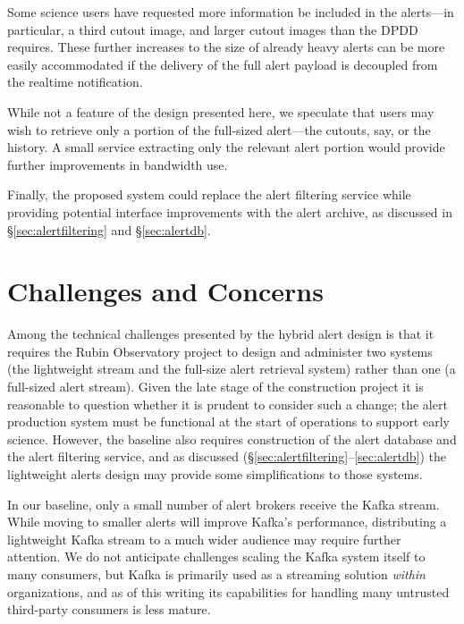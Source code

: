 \documentclass[DM,authoryear,toc]{lsstdoc}
\begin{document}
Some science users have requested more information be included in the alerts---in particular, a third cutout image, and larger cutout images than the DPDD requires.
These further increases to the size of already heavy alerts can be more easily accommodated if the delivery of the full alert payload is decoupled from the realtime notification.

While not a feature of the design presented here, we speculate that users may wish to retrieve only a portion of the full-sized alert---the cutouts, say, or the \DIASource history.
A small service extracting only the relevant alert portion would provide further improvements in bandwidth use.

Finally, the proposed system could replace the alert filtering service while providing potential interface improvements with the alert archive, as discussed in \S \ref{sec:alertfiltering} and \S \ref{sec:alertdb}.

\section{Challenges and Concerns}
Among the technical challenges presented by the hybrid alert design is that it requires the Rubin Observatory project to design and administer two systems (the lightweight stream and the full-size alert retrieval system) rather than one (a full-sized alert stream).
Given the late stage of the construction project it is reasonable to question whether it is prudent to consider such a change; the alert production system must be functional at the start of operations to support early science.
However, the baseline also requires construction of the alert database and the alert filtering service, and as discussed (\S \ref{sec:alertfiltering}--\ref{sec:alertdb}) the lightweight alerts design may provide some simplifications to those systems.

In our baseline, only a small number of alert brokers receive the Kafka stream.
While moving to smaller alerts will improve Kafka's performance, distributing a lightweight Kafka stream to a much wider audience may require further attention.
We do not anticipate challenges scaling the Kafka system itself to many consumers, but Kafka is primarily used as a streaming solution \textit{within} organizations, and as of this writing its capabilities for handling many untrusted third-party consumers is less mature.
\end{document}
